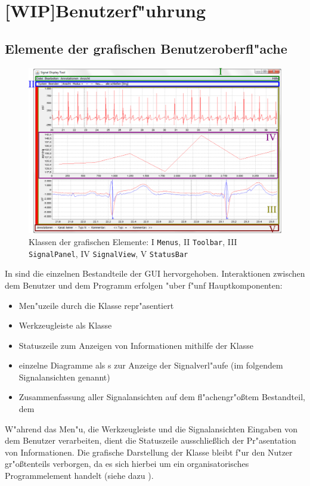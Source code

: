 \section{[WIP]Benutzerf"uhrung}

\subsection{Elemente der grafischen Benutzeroberfl"ache}

\begin{figure}[htb]
\centering
\includegraphics[width=\textwidth]{bilder/programm_ansicht.eps}
\caption[Klassen der grafischen Elemente]{Klassen der grafischen Elemente: I \texttt{Menus}, II \texttt{Toolbar}, III \texttt{SignalPanel}, IV \texttt{SignalView}, V \texttt{StatusBar}}
\label{pic:gui_elements_and_classes}
\end{figure}

In  sind die einzelnen Bestandteile der \ac{GUI} hervorgehoben.
Interaktionen zwischen dem Benutzer und dem Programm erfolgen "uber f"unf Hauptkomponenten:
\begin{itemize}
	\item Men"uzeile durch die Klasse  repr"asentiert
	\item Werkzeugleiste als Klasse 
	\item Statuszeile zum Anzeigen von Informationen mithilfe der Klasse 
	\item einzelne Diagramme als s zur Anzeige der Signalverl"aufe (im folgendem Signalansichten genannt)
	\item Zusammenfassung aller Signalansichten auf dem fl"achengr"o{\ss}tem Bestandteil, dem 
\end{itemize}
W"ahrend das Men"u, die Werkzeugleiste und die Signalansichten Eingaben von dem Benutzer verarbeiten, dient die Statuszeile ausschlie{\ss}lich der Pr"asentation von Informationen.
Die grafische Darstellung der Klasse  bleibt f"ur den Nutzer gr"o{\ss}tenteils verborgen, da es sich hierbei um ein organisatorisches Programmelement handelt (siehe dazu ).

